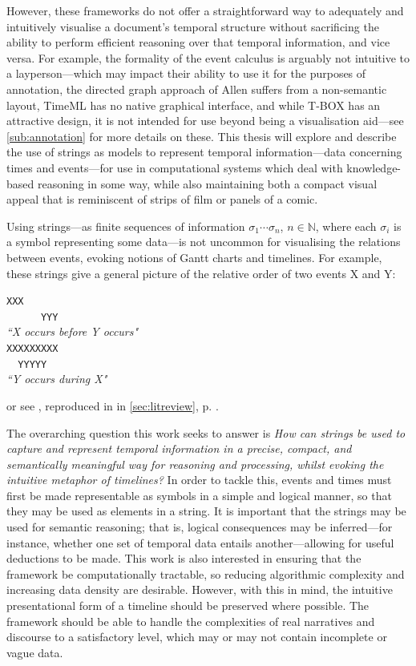 \documentclass[a4paper,12pt,leqno]{article}
\begin{document}
However, these frameworks do not offer a straightforward way to adequately and intuitively visualise a document's temporal structure without sacrificing the ability to perform efficient reasoning over that temporal information, and vice versa. For example, the formality of the event calculus is arguably not intuitive to a layperson---which may impact their ability to use it for the purposes of annotation, the directed graph approach of Allen suffers from a non-semantic layout, TimeML has no native graphical interface, and while T-BOX has an attractive design, it is not intended for use beyond being a visualisation aid---see \cref{sub:annotation} for more details on these. This thesis will explore and describe the use of strings as models to represent temporal information---data concerning times and events---for use in computational systems which deal with knowledge-based reasoning in some way, while also maintaining both a compact visual appeal that is reminiscent of strips of film or panels of a comic.

Using strings---as finite sequences of information $\sigma_1 \cdots \sigma_n$, $n \in \mathbb{N}$, where each $\sigma_i$ is a symbol representing some data---is not uncommon for visualising the relations between events, evoking notions of Gantt charts and timelines. For example, these strings give a general picture of the relative order of two events X and Y:

{
\singlespacing
\begin{center}
\verb|XXX      |\\
\verb|      YYY|\\
\textit{``X occurs before Y occurs"}\\
\vspace{1em}
\verb|XXXXXXXXX|\\
\verb|  YYYYY  |\\
\textit{``Y occurs during X"}\\
\end{center}
}
\noindent
or see \citet[p. 835, Figure 2]{allen1983maintaining}, reproduced in  in \cref{sec:litreview}, p. \pageref{fig:allens-pictorial}.

The overarching question this work seeks to answer is {\sl How can strings be used to capture and represent temporal information in a precise, compact, and semantically meaningful way for reasoning and processing, whilst evoking the intuitive metaphor of timelines?} In order to tackle this, events and times must first be made representable as symbols in a simple and logical manner, so that they may be used as elements in a string. It is important that the strings may be used for semantic reasoning; that is, logical consequences may be inferred---for instance, whether one set of temporal data entails another---allowing for useful deductions to be made. This work is also interested in ensuring that the framework be computationally tractable, so reducing algorithmic complexity and increasing data density are desirable. However, with this in mind, the intuitive presentational form of a timeline should be preserved where possible. The framework should be able to handle the complexities of real narratives and discourse to a satisfactory level, which may or may not contain incomplete or vague data.
\end{document}
